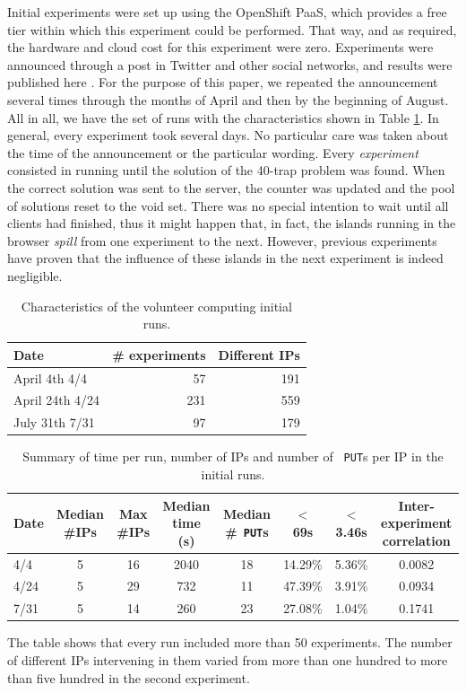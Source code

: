\documentclass[journal,onecolumn]{IEEEtran}
\begin{document}
Initial experiments were set up using the OpenShift
PaaS, which provides a free tier within which this 
experiment could be performed. That way, and as required, the hardware
and cloud cost for this experiment were zero. Experiments were
announced through a post in Twitter and other social networks, and
results were published here \cite{DBLP:conf/gecco/GuervosG15}. For the
purpose of this paper, we repeated the announcement several times
through the months of April and then by the beginning of August. All
in all, we have the set of runs with the characteristics shown in
Table \ref{tab:runs}. In general, every experiment took several
days. No particular care was taken about the time of the announcement
or the particular wording. Every {\em experiment} consisted in running
until the solution of the 40-trap problem was found. When the correct
solution was sent to the server, the counter was updated and the pool
of solutions reset to the void set. There was no special intention to wait
until all clients had finished, thus it might happen that, in fact,
the islands running in the browser {\em spill} from one experiment to
the next. However, previous experiments have proven that the influence
of these islands in the next experiment is indeed negligible.
%
\begin{table}
\caption{Characteristics of the volunteer computing initial runs. \label{tab:runs}}
\begin{center}
\begin{tabular}{l|rr}
\hline
Date & \# experiments & Different IPs \\
\hline
April 4th 4/4 & 57 & 191 \\
April 24th 4/24 &  231 & 559 \\
July 31th 7/31 & 97 & 179 \\
\hline
\end{tabular}
\end{center}
\end{table}
%
\begin{table}
\caption{Summary of time per run, number of IPs and number of {\tt
    PUT}s per IP in the initial runs. \label{tab:summary:os}}
\begin{center}
\begin{tabular}{l|ccccccc}
\hline
Date & Median \#IPs & Max \#IPs & Median time (s) & Median \#{\tt
  PUT}s & $<$ 69s & $<$ 3.46s & Inter-experiment correlation\\
\hline
4/4 & 5 & 16 & 2040 & 18 & 14.29\% & 5.36\% & 0.0082 \\
4/24 &  5 & 29 & 732 & 11 & 47.39\% & 3.91\% & 0.0934\\
7/31 & 5 & 14 & 260 & 23 & 27.08\% & 1.04\%  & 0.1741\\
\hline
\end{tabular}
\end{center}
\end{table}
%
The table shows that every run included more than 50 experiments. The
number of different IPs intervening in them varied from more than one
hundred to more than five hundred in the second experiment.
\end{document}
